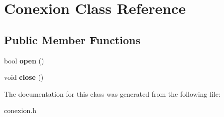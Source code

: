 \hypertarget{classConexion}{}\section{Conexion Class Reference}
\label{classConexion}
\subsection*{Public Member Functions}
\begin{DoxyCompactItemize}
\item 
\mbox{\label{classConexion_af697de4217c41446258b49844b4d85c1}} 
bool {\bfseries open} ()
\item 
\mbox{\label{classConexion_ac83336bc48ea39ae47c2e8b0b10fba64}} 
void {\bfseries close} ()
\end{DoxyCompactItemize}


The documentation for this class was generated from the following file\+:\begin{DoxyCompactItemize}
\item 
conexion.\+h\end{DoxyCompactItemize}
